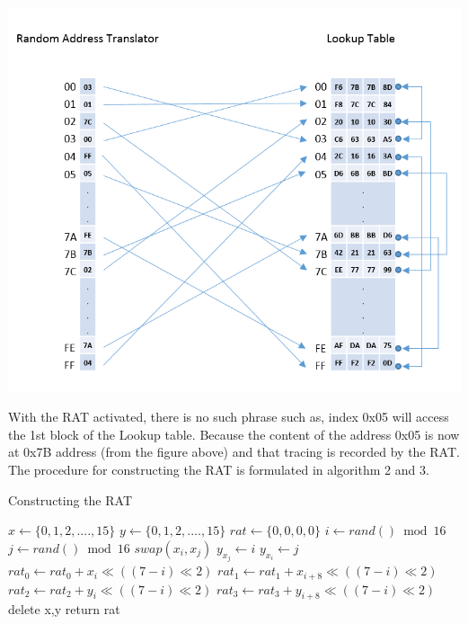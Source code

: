 \begin{center}
\includegraphics[scale=0.38,natwidth=785,natheight=666]{Figures/rat-scrambled(new).png}
\label{fig: Random Address Translator Scrambled.}
\end{center}

With the RAT activated, there is no such phrase such as, index 0x05 will access the 1st block of the Lookup table. Because the content of the address 0x05 is now at 0x7B address (from the figure above) and that tracing is recorded by the RAT. The procedure for constructing the RAT is formulated in algorithm 2 and 3.

\begin{algorithm}
	\caption{Constructing the RAT}
	\label{Constructing the RAT}

	\begin{algorithmic}[1]
	
	\State $x\gets \{0,1,2,....,15\}$
	\State $y\gets \{0,1,2,....,15\}$
	\State $rat\gets\{0,0,0,0\}$
		\State $i\gets rand() \bmod 16$
		\State $j\gets rand() \bmod 16$
		\State $swap(x_i,x_j)$
		\State $y_{x_j}\gets i$
		\State $y_{x_i}\gets j$
	\EndFor
		\State $rat_0 \gets rat_0 + x_i\ll((7-i)\ll2)$
		\State $rat_1 \gets rat_1 + x_{i+8}\ll((7-i)\ll2)$
		\State $rat_2 \gets rat_2 + y_i\ll((7-i)\ll2)$
		\State $rat_3 \gets rat_3 + y_{i+8}\ll((7-i)\ll2)$
	\EndFor
	\State delete x,y
	\State return rat
	
	\EndFunction	
	\end{algorithmic}
\end{algorithm}


